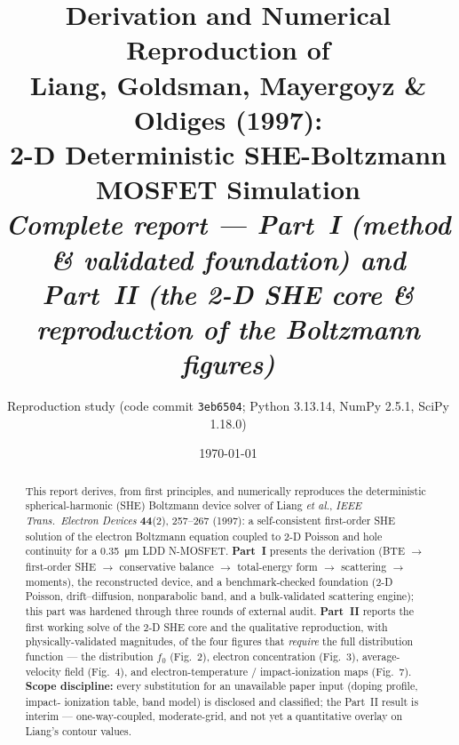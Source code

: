 \documentclass[11pt]{article}
\title{\textbf{Derivation and Numerical Reproduction of\\
Liang, Goldsman, Mayergoyz \& Oldiges (1997):\\
2-D Deterministic SHE-Boltzmann MOSFET Simulation}\\[5pt]
\large\textit{Complete report --- Part~I (method \& validated foundation) and\\
Part~II (the 2-D SHE core \& reproduction of the Boltzmann figures)}}
\author{Reproduction study \quad\small(code commit \texttt{3eb6504}; Python 3.13.14, NumPy 2.5.1, SciPy 1.18.0)}
\date{\today}
\begin{document}
\maketitle

\begin{abstract}
\noindent
This report derives, from first principles, and numerically reproduces the deterministic
spherical-harmonic (SHE) Boltzmann device solver of Liang \emph{et al.}, \emph{IEEE Trans.\
Electron Devices} \textbf{44}(2), 257--267 (1997): a self-consistent first-order SHE solution
of the electron Boltzmann equation coupled to 2-D Poisson and hole continuity for a
\SI{0.35}{\micro\meter} LDD N-MOSFET. \textbf{Part~I} presents the derivation (BTE $\to$
first-order SHE $\to$ conservative balance $\to$ total-energy form $\to$ scattering $\to$
moments), the reconstructed device, and a benchmark-checked foundation (2-D Poisson,
drift--diffusion, nonparabolic band, and a bulk-validated scattering engine); this part was
hardened through three rounds of external audit. \textbf{Part~II} reports the first working
solve of the 2-D SHE core and the qualitative reproduction, with physically-validated
magnitudes, of the four figures that \emph{require} the full distribution function --- the
distribution $f_0$ (Fig.~2), electron concentration (Fig.~3), average-velocity field
(Fig.~4), and electron-temperature / impact-ionization maps (Fig.~7). \textbf{Scope
discipline:} every substitution for an unavailable paper input (doping profile, impact-
ionization table, band model) is disclosed and classified; the Part~II result is interim ---
one-way-coupled, moderate-grid, and not yet a quantitative overlay on Liang's contour values.
\end{abstract}

\tableofcontents
\end{document}
